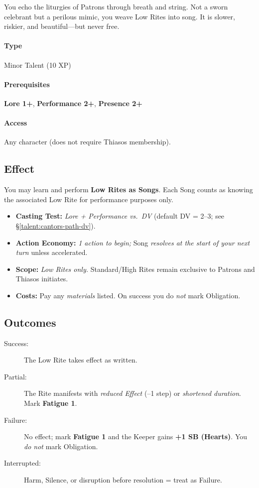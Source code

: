 \begin{tcolorbox}[colback=black!3,colframe=black!40!white,title={Cantor's Path}]
You echo the liturgies of Patrons through breath and string. Not a sworn celebrant but a perilous mimic, you weave Low Rites into song. It is slower, riskier, and beautiful---but never free.
\end{tcolorbox}

\paragraph*{Type} Minor Talent (10 XP) \quad
\paragraph*{Prerequisites} \textbf{Lore 1+}, \textbf{Performance 2+}, \textbf{Presence 2+} \quad
\paragraph*{Access} Any character (does not require Thiasos membership).

\subsection*{Effect}
You may learn and perform \textbf{Low Rites as Songs}. Each Song counts as knowing the associated Low Rite for performance purposes only.

\begin{itemize}
\item \textbf{Casting Test:} \emph{Lore + Performance vs.\ DV} (default DV = 2--3; see \S\ref{talent:cantors-path-dv}).
\item \textbf{Action Economy:} \emph{1 action to begin;} Song \emph{resolves at the start of your next turn} unless accelerated.
\item \textbf{Scope:} \emph{Low Rites only.} Standard/High Rites remain exclusive to Patrons and Thiasos initiates.
\item \textbf{Costs:} Pay any \emph{materials} listed. On success you do \emph{not} mark Obligation.
\end{itemize}

\subsection*{Outcomes}
\begin{description}
\item[Success:] The Low Rite takes effect as written.
\item[Partial:] The Rite manifests with \emph{reduced Effect} (–1 step) or \emph{shortened duration}. Mark \textbf{Fatigue 1}.
\item[Failure:] No effect; mark \textbf{Fatigue 1} and the Keeper gains \textbf{+1 SB (Hearts)}. You \emph{do not} mark Obligation.
\item[Interrupted:] Harm, Silence, or disruption before resolution = treat as Failure.
\end{description}

